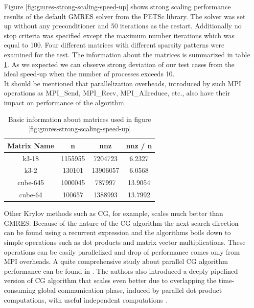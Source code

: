 Figure \ref{fig:gmres-strong-scaling-speed-up} shows strong scaling performance results of the default GMRES solver from the PETSc library. The solver was set up without any preconditioner and 50 iterations as the restart. Additionally no stop criteria was specified except the maximum number iterations which was equal to 100. Four different matrices with different sparsity patterns were examined for the test. The information about the matrices is summarized in table \ref{table:matrix-info-1}. As we expected we can observe strong deviation of our test cases from the ideal speed-up when the number of processes exceeds 10.\\

It should be mentioned that parallelization overheads, introduced by such MPI operations as MPI\_Send, MPI\_Recv, MPI\_Allreduce, etc., also have their impact on performance of the algorithm.\\

\begin{table}[htpb]
\centering
\begin{tabular}{|c|c|c|c|}
\hline
Matrix Name & n       & nnz      & nnz / n \\ \hline
k3-18       & 1155955 & 7204723  & 6.2327  \\ \hline
k3-2        & 130101  & 13906057 & 6.0568  \\ \hline
cube-645    & 1000045 & 787997   & 13.9054 \\ \hline
cube-64     & 100657  & 1388993  & 13.7992 \\ \hline
\end{tabular}
\caption{Basic information about matrices used in figure \ref{fig:gmres-strong-scaling-speed-up}}
\label{table:matrix-info-1}
\end{table}

Other Krylov methods such as CG, for example, scales much better than GMRES. Because of the nature of the CG algorithm the next search direction can be found using a recurrent expression and the algorithms boils down to simple operations such as dot products and matrix vector multiplications. These operations can be easily parallelized and drop of performance comes only from MPI overheads. A quite comprehensive study about parallel CG algorithm performance can be found in \cite{sparse-la:cg}. The authors also introduced a deeply pipelined version of CG algorithm that scales even better due to overlapping the time-consuming global communication phase, induced by parallel dot product computations, with useful independent computations \cite{sparse-la:cg}.\\



